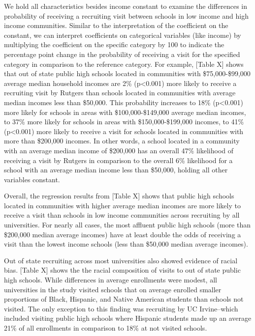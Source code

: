 \documentclass[twoside]{article}
\begin{document}
We hold all characteristics besides income constant to examine the differences in probability of receiving a recruiting visit between schools in low income and high income communities. Similar to the interpretation of the coefficient on the constant, we can interpret coefficients on categorical variables (like income) by multiplying the coefficient on the specific category by 100 to indicate the percentage point change in the probability of receiving a visit for the specified category in comparison to the reference category. For example, [Table X] shows that out of state public high schools located in communities with \$75,000-\$99,000 average median household incomes are 2\% (p<0.001) more likely to receive a recruiting visit by Rutgers than schools located in communities with average median incomes less than \$50,000. This probability increases to 18\%  (p<0.001) more likely for schools in areas with \$100,000-\$149,000 average median incomes, to 37\% more likely for schools in areas with \$150,000-\$199,000 incomes, to 41\% (p<0.001) more likely to receive a visit for schools located in communities with more than \$200,000 incomes. In other words, a school located in a community with an average median income of \$200,000 has an overall 47\% likelihood of receiving a visit by Rutgers in comparison to the overall 6\% likelihood for a school with an average median income less than \$50,000, holding all other variables constant.

Overall, the regression results from [Table X] shows that public high schools located in communities with higher average median incomes are more likely to receive a visit than schools in low income communities across recruiting by all universities. For nearly all cases, the most affluent public high schools (more than \$200,000 median average incomes) have at least double the odds of receiving a visit than the lowest income schools (less than \$50,000 median average incomes). 

Out of state recruiting across most universities also showed evidence of racial bias. [Table X] shows the the racial composition of visits to out of state public high schools. While differences in average enrollments were modest, all universities in the study visited schools that on average enrolled smaller proportions of Black, Hispanic, and Native American students than schools not visited. The only exception to this finding was recruiting by UC Irvine--which included visiting public high schools where Hispanic students made up an average 21\% of all enrollments in comparison to 18\% at not visited schools. 
\end{document}
